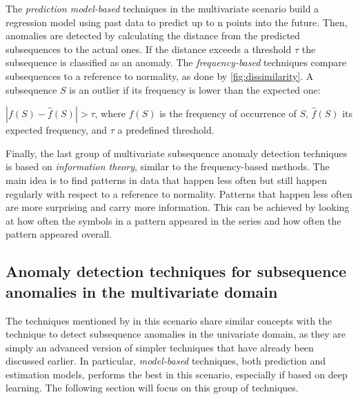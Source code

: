 The \textit{prediction model-based} techniques in the multivariate scenario build a regression model using past data to predict up to n points into the future. Then, anomalies are detected by calculating the distance from the predicted subsequences to the actual ones. If the distance exceeds a threshold $\tau$ the subsequence is classified as an anomaly. The 
 \textit{frequency-based} techniques compare subsequences to a reference to normality, as done by  \autoref{fig:dissimilarity}. A subsequence $S$ is an
outlier if its frequency is lower than the expected one:
\begin{definition}\label{def:frequency-based}
    $|f(S) - \hat{f}(S)| > \tau $, where $f(S)$ is the frequency of occurrence of $S$, $\hat{f}(S)$ its expected frequency, and $\tau$ a predefined threshold.
\end{definition}
Finally, the last group of multivariate subsequence anomaly detection techniques is based on \textit{information theory}, similar to the frequency-based methods. The main idea is to find patterns in data that happen less often but still happen regularly with respect to a reference to normality. Patterns that happen less often are more surprising and carry more information. This can be achieved by looking at how often the symbols in a pattern appeared in the series and how often the pattern appeared overall. 

\subsection{Anomaly detection techniques for subsequence anomalies in the multivariate domain}
\label{ss:ad-subsequence-multivariate}
The techniques mentioned by \cite{blazquez2020review} in this scenario share similar concepts with the technique to detect subsequence anomalies in the univariate domain, as they are simply an advanced version of simpler techniques that have already been discussed earlier. In particular, \textit{model-based} techniques, both prediction and estimation models, performs the best in this scenario, especially if based on deep learning. The following section will focus on this group of techniques.


